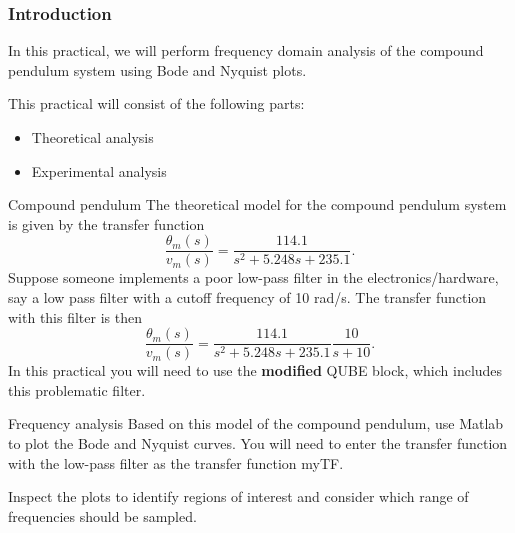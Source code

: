 \documentclass[9pt]{beamer-control}
\begin{document}

\begin{frame}
\frametitle{Introduction}
In this practical, we will perform frequency domain analysis of the compound pendulum system using Bode and Nyquist plots.

\vfill

This practical will consist of the following parts:
\begin{itemize}
\item Theoretical analysis
\item Experimental analysis
\end{itemize}
\end{frame}



\begin{frame}{Compound pendulum}
The theoretical model for the compound pendulum system is given by the transfer function
\[\frac{\theta_m(s)}{v_m(s)} = \frac{114.1}{s^2 + 5.248s+235.1}. \]
Suppose someone implements a poor low-pass filter in the electronics/hardware, say a low pass filter with a cutoff frequency of 10 rad/s. The transfer function with this filter is then
\[\frac{\theta_m(s)}{v_m(s)} = \frac{114.1}{s^2 + 5.248s+235.1}\frac{10}{s+10}. \]
In this practical you will need to use the \textbf{modified} QUBE block, which includes this problematic filter.
\end{frame}

\begin{frame}{Frequency analysis}
Based on this model of the compound pendulum, use Matlab to plot the Bode and Nyquist curves. You will need to enter the transfer function with the low-pass filter as the transfer function myTF.


Inspect the plots to identify regions of interest and consider which range of frequencies should be sampled.

\end{frame}

\end{document}
